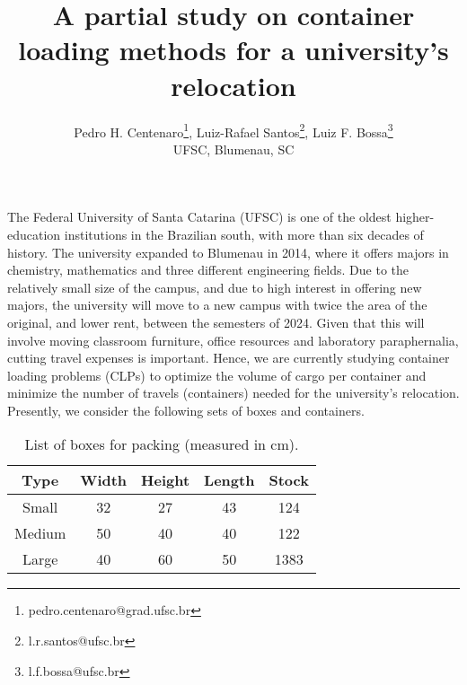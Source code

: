 \documentclass{pssbmac}
\begin{document}

\title{A partial study on container loading methods for a university's relocation}

\author{
    {\large Pedro H. Centenaro}\thanks{pedro.centenaro@grad.ufsc.br}, {\large Luiz-Rafael Santos}\thanks{l.r.santos@ufsc.br}, {\large Luiz F. Bossa}\thanks{l.f.bossa@ufsc.br}\\
    {\small UFSC, Blumenau, SC} \\
}
\criartitulo



The Federal University of Santa Catarina (UFSC) is one of the oldest higher-education institutions in the Brazilian south, with more than six decades of history. The university expanded to Blumenau in 2014, where it offers majors in chemistry, mathematics and three different engineering fields. Due to the relatively small size of the campus, and due to high interest in offering new majors, the university will move to a new campus with twice the area of the original, and lower rent, between the semesters of 2024. Given that this will involve moving classroom furniture, office resources and laboratory paraphernalia, cutting travel expenses is important. Hence, we are currently studying container loading problems (CLPs) to optimize the volume of cargo per container and minimize the number of travels (containers) needed for the university's relocation. Presently, we consider the following sets of boxes and containers.

\begin{table}[H]
\caption{ {\small List of boxes for packing (measured in cm).}}
\centering
\begin{tabular}{ccccc}
\hline
Type  & Width & Height & Length & Stock\\ \hline
Small  & 32 & 27 & 43 & 124\\
Medium & 50 & 40 & 40 & 122\\
Large  & 40 & 60 & 50 & 1383\\
\hline
\end{tabular}\label{List boxes}
\end{table}
\end{document}
